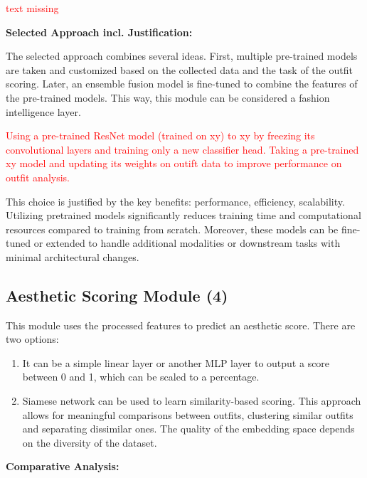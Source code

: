 \textcolor{red}{text missing}

\vspace{0.5cm}

\textbf{Selected Approach incl. Justification:}

\vspace{0.5cm}

The selected approach combines several ideas. First, multiple pre-trained models are taken and customized based on the collected data and the task of the outfit scoring. Later, an ensemble fusion model is fine-tuned to combine the features of the pre-trained models. This way, this module can be considered a fashion intelligence layer.

\textcolor{red}{Using a pre-trained \acs{ResNet} model (trained on xy) to xy by freezing its convolutional layers and training only a new classifier head. Taking a pre-trained xy model and updating its weights on outift data to improve performance on outfit analysis.}

This choice is justified by the key benefits: performance, efficiency, scalability. Utilizing pretrained models significantly reduces training time and computational resources compared to training from scratch. Moreover, these models can be fine-tuned or extended to handle additional modalities or downstream tasks with minimal architectural changes.

\subsection{Aesthetic Scoring Module (4)}

This module uses the processed features to predict an aesthetic score. There are two options:

\begin{enumerate}
   \item It can be a simple linear layer or another \acs{MLP} layer to output a score between 0 and 1, which can be scaled to a percentage.
   \item Siamese network can be used to learn similarity-based scoring. This approach allows for meaningful comparisons between outfits, clustering similar outfits and separating dissimilar ones. The quality of the embedding space depends on the diversity of the dataset.
\end{enumerate}

\vspace{0.5cm}

\textbf{Comparative Analysis:}

